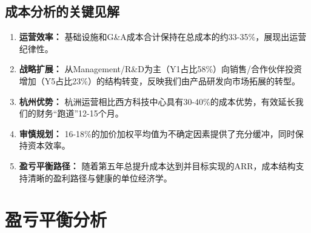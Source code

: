 \documentclass[11点, A4纸, 单面]{article}
\begin{document}
\begin{table}[H]
\centering
\caption{基础设施与平台投资回报率}
\label{tab:infrastructure_roi}
\end{table}

\subsection{成本分析的关键见解}

\begin{enumerate}
    \item \textbf{运营效率：} 基础设施和G\&A成本合计保持在总成本的约33-35\%，展现出运营纪律性。
    
    \item \textbf{战略扩展：} 从Management/R\&D为主（Y1占比58\%）向销售/合作伙伴投资增加（Y5占比23\%）的结构转变，反映我们由产品研发向市场拓展的转型。
    
    \item \textbf{杭州优势：} 杭洲运营相比西方科技中心具有30-40\%的成本优势，有效延长我们的财务“跑道”12-15个月。
    
    \item \textbf{审慎规划：} 16-18\%的加价加权平均值为不确定因素提供了充分缓冲，同时保持资本效率。
    
    \item \textbf{盈亏平衡路径：} 随着第五年总提升成本达到并目标实现的ARR，成本结构支持清晰的盈利路径与健康的单位经济学。
\end{enumerate}



\section{盈亏平衡分析}
\end{document}
